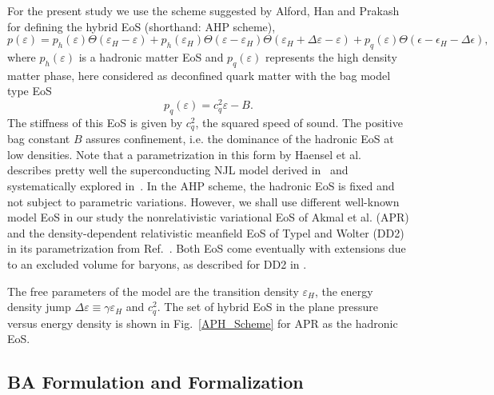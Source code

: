 {%
For the present study we use the scheme suggested by Alford, Han and
Prakash~\cite{Alford:2013aca} for defining the hybrid EoS (shorthand:
AHP scheme),
\begin{equation}
p(\varepsilon)=p_{h}(\varepsilon)\Theta(\varepsilon_{H}-\varepsilon)+p_{h}(\varepsilon_{H})\Theta(\varepsilon-\varepsilon_{H})\Theta(\varepsilon_{H}+\Delta\varepsilon-\varepsilon)+p_{q}(\varepsilon)\Theta(\epsilon-\epsilon_{H}-\Delta\epsilon),
\end{equation}
where $p_{h}(\varepsilon)$ is a hadronic matter EoS and $p_{q}(\varepsilon)$
represents the high density matter phase, here considered as deconfined
quark matter with the bag model type EoS
\begin{equation}
p_{q}(\varepsilon)=c_{q}^{2}\varepsilon-B.
\end{equation}
The stiffness of this EoS is given by $c_{q}^{2}$, the squared speed
of sound. The positive bag constant $B$ assures confinement, i.e.
the dominance of the hadronic EoS at low densities. Note that a parametrization
in this form by Haensel et al.~\cite{Zdunik:2012dj} describes pretty
well the superconducting NJL model derived in~\cite{Klahn:2006iw}
and systematically explored in~\cite{Klahn:2013kga}. In the AHP
scheme, the hadronic EoS is fixed and not subject to parametric variations.
However, we shall use different well-known model EoS in our study
the nonrelativistic variational EoS of Akmal et al. \cite{Akmal:1998cf}
(APR) and the density-dependent relativistic meanfield EoS of Typel
and Wolter \cite{Typel:1999yq} (DD2) in its parametrization from
Ref.~\cite{Typel:2009sy}. Both EoS come eventually with extensions
due to an excluded volume for baryons, as described for DD2 in \cite{Benic:2014jia}.
}


{The free parameters of the model are the transition density
$\varepsilon_{H}$, the energy density jump $\Delta\varepsilon\equiv\gamma\varepsilon_{H}$
and $c_{q}^{2}$. The set of hybrid EoS in the plane pressure versus
energy density is shown in Fig.~\ref{APH_Scheme} for APR as the
hadronic EoS. %
}


\subsection{BA Formulation and Formalization}

